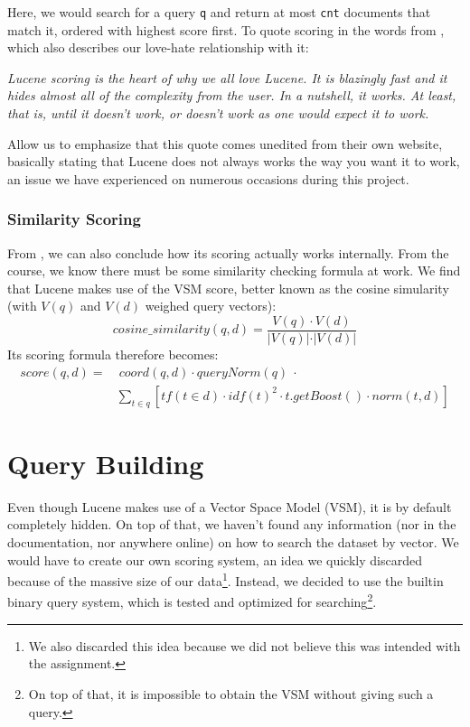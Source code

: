 \documentclass[11pt]{article}
\begin{document}
Here, we would search for a query \texttt{q} and return at most \texttt{cnt} documents that match it, ordered with highest score first. To quote scoring in the words from \cite{lucene}, which also describes our love-hate relationship with it:
\begin{displayquote}
    \textsl{Lucene scoring is the heart of why we all love Lucene. It is blazingly fast and it hides almost all of the complexity from the user. In a nutshell, it works. At least, that is, until it doesn't work, or doesn't work as one would expect it to work.}
\end{displayquote}

Allow us to emphasize that this quote comes unedited from their own website, basically stating that Lucene does not always works the way you want it to work, an issue we have experienced on numerous occasions during this project.

\subsubsection{Similarity Scoring}
From \cite{lucene}, we can also conclude how its scoring actually works internally. From the course, we know there must be some similarity checking formula at work. We find that Lucene makes use of the \textsf{VSM score}, better known as the \textsf{cosine simularity} (with $V(q)$ and $V(d)$ weighed query vectors):
$$cosine\_similarity(q, d) = \frac{V(q)\cdot V(d)}{\vert V(q)\vert\cdot\vert V(d)\vert}$$
Its scoring formula therefore becomes:
\begin{align*}
    score(q, d) =&\ coord(q, d)\cdot queryNorm(q)\ \cdot\\
    &\sum_{t \in q}\left[tf(t\in d)\cdot idf(t)^2 \cdot t.getBoost()\cdot norm(t, d)\right]
\end{align*}

\section{Query Building}\label{sec:query}
Even though Lucene makes use of a Vector Space Model (VSM), it is by default completely hidden. On top of that, we haven't found any information (nor in the documentation, nor anywhere online) on how to search the dataset by vector. We would have to create our own scoring system, an idea we quickly discarded because of the massive size of our data\footnote{We also discarded this idea because we did not believe this was intended with the assignment.}. Instead, we decided to use the builtin binary query system, which is tested and optimized for searching\footnote{On top of that, it is impossible to obtain the VSM without giving such a query.}.
\end{document}
